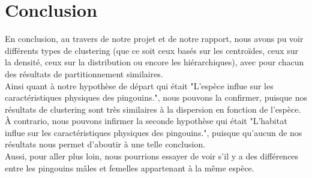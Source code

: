 \documentclass[a4paper, titlepage]{report}
\begin{document}
\section*{Conclusion}
\textnormal{En conclusion, au travers de notre projet et de notre rapport, nous avons pu voir différents types de clustering (que ce soit ceux basés sur les centroïdes, ceux sur la densité, ceux sur la distribution ou encore les hiérarchiques), avec pour chacun des résultats de partitionnement similaires.\\
Ainsi quant à notre hypothèse de départ qui était "L'espèce influe sur les caractéristiques physiques des pingouins.", nous pouvons la confirmer, puisque nos résultats de clustering sont très similaires à la dispersion en fonction de l'espèce.\\
À contrario, nous pouvons infirmer la seconde hypothèse qui était "L'habitat influe sur les caractéristiques physiques des pingouins.", puisque qu'aucun de nos résultats nous permet d'aboutir à une telle conclusion.\\
Aussi, pour aller plus loin, nous pourrions essayer de voir s'il y a des différences entre les pingouins mâles et femelles appartenant à la même espèce.}
\end{document}
